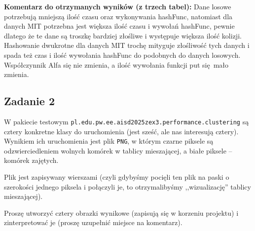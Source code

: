 \documentclass[twoside]{article}
\begin{document}
\noindent \textbf{Komentarz do otrzymanych wyników (z trzech tabel):} 
Dane losowe potrzebują mniejszą ilość czasu oraz wykonywania hashFunc,
natomiast dla danych MIT potrzebna jest większa ilość czasu i wywołań hashFunc,
pewnie dlatego że te dane są troszkę bardziej złośliwe i występuje większa
ilość kolizji. Hashowanie dwukrotne dla danych MIT trochę mityguje złośliwość
tych danych i spada też czas i ilość wywołania hashFunc do podobnych do danych
losowych. Współczynnik Alfa się nie zmienia, a ilość wywołania funkcji put
się mało zmienia. 

\newpage

\subsection{Zadanie 2}
W pakiecie testowym \verb|pl.edu.pw.ee.aisd2025zex3.performance.clustering| są cztery konkretne klasy do uruchomienia (jest sześć, ale nas interesują cztery). Wynikiem ich uruchomienia jest plik \verb|PNG|, w którym czarne piksele są odzwierciedleniem wolnych komórek w tablicy mieszającej, a białe piksele -- komórek zajętych.

Plik jest zapisywany wierszami (czyli gdybyśmy pocięli ten plik na paski o szerokości jednego piksela i połączyli je, to otrzymalibyśmy ,,wizualizację'' tablicy mieszającej).

Proszę utworzyć cztery obrazki wynikowe (zapisują się w korzeniu projektu) i zinterpretować je (proszę uzupełnić miejsce na komentarz).
\end{document}
